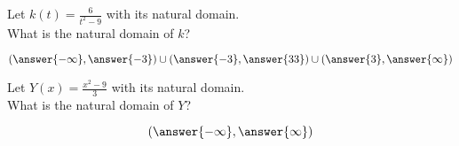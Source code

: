 \documentclass{ximera}
\begin{document}
\begin{exercise}
\begin{question}


Let $k(t) = \frac{6}{t^2 - 9}$ with its natural domain. \\

What is the natural domain of $k$?

\[
\left( \answer{-\infty}, \answer{-3}  \right) \cup \left( \answer{-3}, \answer{33}  \right) \cup \left( \answer{3}, \answer{\infty}  \right)
\]


\end{question}












\begin{question}


Let $Y(x) = \frac{x^2 - 9}{3}$ with its natural domain. \\

What is the natural domain of $Y$?

\[
\left( \answer{-\infty}, \answer{\infty}  \right)
\]


\end{question}













\end{exercise}
\end{document}
